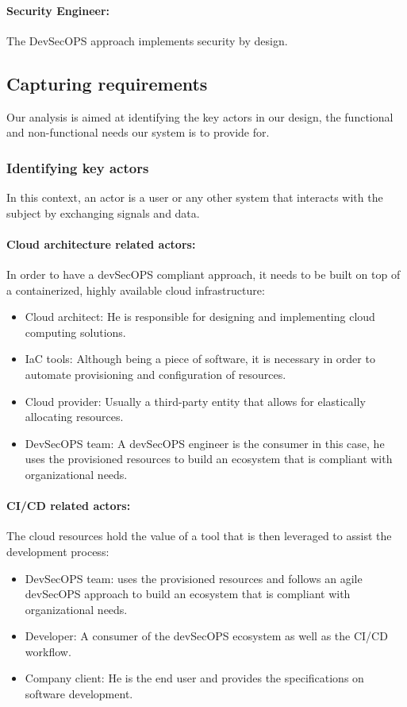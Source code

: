 \paragraph{Security Engineer: }
The DevSecOPS approach implements security by design.

\newpage 

\subsection{Capturing requirements}
Our analysis is aimed at identifying the key actors in our design, the functional and non-functional needs our system is to provide for.

\subsubsection{Identifying key actors}
In this context, an actor is a user or any other system that interacts with the subject by exchanging signals and data.

\paragraph{Cloud architecture related actors:}
In order to have a devSecOPS compliant approach, it needs to be built on top of a containerized, highly available cloud infrastructure:
\begin{itemize}[label={--}]
\item Cloud architect: He is responsible for designing and implementing cloud computing solutions.
\item IaC tools: Although being a piece of software, it is necessary in order to automate provisioning and configuration of resources.
\item Cloud provider: Usually a third-party entity that allows for elastically allocating resources.
\item DevSecOPS team: A devSecOPS engineer is the consumer in this case, he uses the provisioned resources to build an ecosystem that is compliant with organizational needs.
\end{itemize}

\paragraph{CI/CD related actors:}
The cloud resources hold the value of a tool that is then leveraged to assist the development process:
\begin{itemize}[label={--}]
\item DevSecOPS team: uses the provisioned resources and follows an agile devSecOPS approach to build an ecosystem that is compliant with organizational needs.
\item Developer: A consumer of the devSecOPS ecosystem as well as the CI/CD workflow.
\item Company client: He is the end user and provides the specifications on software development.
\end{itemize}

